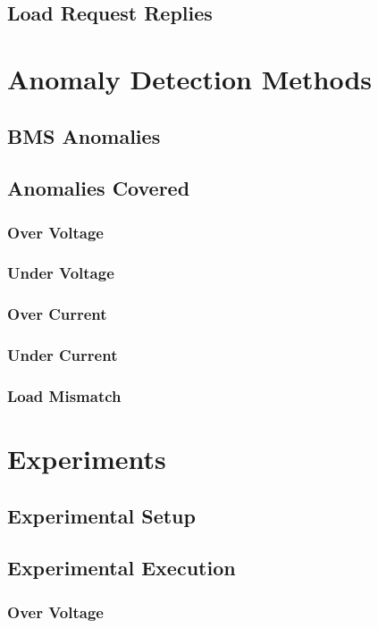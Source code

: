 \documentclass[11pt,conference,draftcls,onecolumn]{IEEEtran}
\begin{document}
\subsection{Load Request Replies}

\section{Anomaly Detection Methods}\label{sec:anomalyDetection}
\subsection{BMS Anomalies}
\subsection{Anomalies Covered}
\subsubsection{Over Voltage}
\subsubsection{Under Voltage}
\subsubsection{Over Current}
\subsubsection{Under Current}
\subsubsection{Load Mismatch}

\section{Experiments}\label{sec:experiments}
\subsection{Experimental Setup}
\subsection{Experimental Execution}
\subsubsection{Over Voltage}
\end{document}

